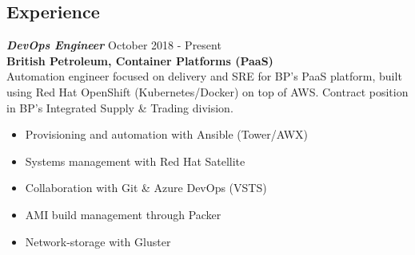 \documentclass[margin, 10pt]{res} %
\begin{document}
     \begin{resume}
     
    \section{Experience}
    
    {\sl \textbf{DevOps Engineer}} \hfill October 2018 - Present \\
    \textbf{British Petroleum, Container Platforms (PaaS)}\\
    Automation engineer focused on delivery and SRE for BP's PaaS platform, built using Red Hat OpenShift (Kubernetes/Docker) on top of AWS. Contract position in BP's Integrated Supply \& Trading division.
    \begin{itemize}
    \item Provisioning and automation with Ansible (Tower/AWX)
    \item Systems management with Red Hat Satellite
    \item Collaboration with Git \& Azure DevOps (VSTS)
    \item AMI build management through Packer
    \item Network-storage with Gluster
    \end{itemize} 
    

\end{resume}
\end{document}
